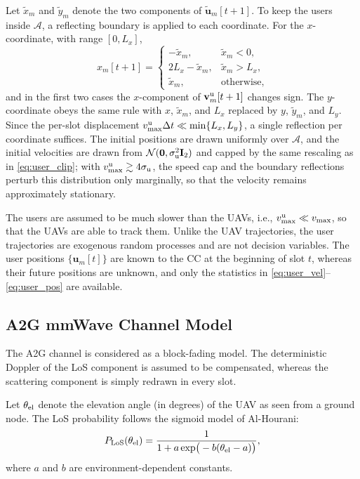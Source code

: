 \documentclass[conference]{IEEEtran}
\begin{document}
Let $\tilde x_m$ and $\tilde y_m$ denote the two components of $\tilde{\mathbf u}_m[t+1]$. To keep the users inside $\mathcal A$, a reflecting boundary is applied to each coordinate. For the $x$-coordinate, with range $[0,L_x]$,
\begin{equation}
x_m[t+1]=
\begin{cases}
-\tilde x_m, & \tilde x_m<0,\\
2L_x-\tilde x_m, & \tilde x_m>L_x,\\
\tilde x_m, & \text{otherwise},
\end{cases}
\label{eq:user_reflect}
\end{equation}
and in the first two cases the $x$-component of $\mathbf v^{\rm u}_m[t+1]$ changes sign. The $y$-coordinate obeys the same rule with $x$, $\tilde x_m$, and $L_x$ replaced by $y$, $\tilde y_m$, and $L_y$. Since the per-slot displacement $v^{\rm u}_{\max}\Delta t\ll\min\{L_x,L_y\}$, a single reflection per coordinate suffices. The initial positions are drawn uniformly over $\mathcal A$, and the initial velocities are drawn from $\mathcal N(\mathbf 0,\sigma_{\rm u}^2\mathbf I_2)$ and capped by the same rescaling as in \eqref{eq:user_clip}; with $v^{\rm u}_{\max}\gtrsim 4\sigma_{\rm u}$, the speed cap and the boundary reflections perturb this distribution only marginally, so that the velocity remains approximately stationary.

The users are assumed to be much slower than the UAVs, i.e., $v^{\rm u}_{\max}\ll v_{\max}$, so that the UAVs are able to track them. Unlike the UAV trajectories, the user trajectories are exogenous random processes and are not decision variables. The user positions $\{\mathbf u_m[t]\}$ are known to the CC at the beginning of slot $t$, whereas their future positions are unknown, and only the statistics in \eqref{eq:user_vel}--\eqref{eq:user_pos} are available.

\subsection{A2G mmWave Channel Model}\label{sec:channel}

The A2G channel is considered as a block-fading model. The deterministic Doppler of the LoS component is assumed to be compensated, whereas the scattering component is simply redrawn in every slot.

Let $\theta_{\rm el}$ denote the elevation angle (in degrees) of the UAV as seen from a ground node. The LoS probability follows the sigmoid model of Al-Hourani:
\begin{equation}
P_{\rm LoS}(\theta_{\rm el})=\frac{1}{1+a\exp\!\big(-b(\theta_{\rm el}-a)\big)},
\end{equation}
where $a$ and $b$ are environment-dependent constants.
\end{document}
